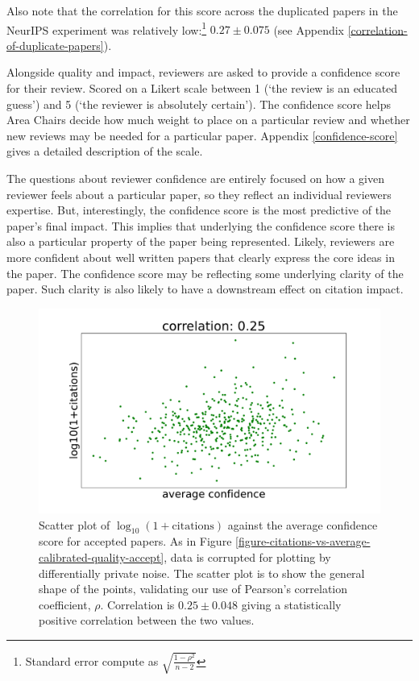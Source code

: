 \documentclass[twoside]{article}
\begin{document}
Also note that the correlation for this score across the duplicated papers in the NeurIPS experiment was relatively low:\footnote{Standard error compute as $\sqrt{\frac{1-\rho^2}{n-2}}$} $0.27 \pm 0.075$ (see Appendix \ref{correlation-of-duplicate-papers}).

Alongside quality and impact, reviewers are asked to provide a confidence score for their review. Scored on a Likert scale between 1 (`the review is an educated guess') and 5 (`the reviewer is absolutely certain'). The confidence score helps Area Chairs decide how much weight to place on a particular review and whether new reviews may be needed for a particular paper. Appendix \ref{confidence-score} gives a detailed description of the scale.  

The questions about reviewer confidence are entirely focused on how a given reviewer feels about a particular paper, so they reflect an individual reviewers expertise. But, interestingly, the confidence score is the most predictive of the paper's final impact. This implies that underlying the confidence score there is also a particular property of the paper being represented. Likely, reviewers are more confident about well written papers that clearly express the core ideas in the paper. The confidence score may be reflecting some underlying clarity of the paper. Such clarity is also likely to have a downstream effect on citation impact.

\begin{figure}[htb]
\includegraphics[width=0.9\columnwidth]{diagrams/neurips/citations-vs-average-confidence-accept.pdf}

\caption{Scatter plot of $\log_{10}(1+\text{citations})$ against the average confidence score for accepted papers. As in Figure \ref{figure-citations-vs-average-calibrated-quality-accept}, data is corrupted for plotting by differentially private noise. The scatter plot is to show the general shape of the points, validating our use of Pearson's correlation coefficient, $\rho$. Correlation is $0.25 \pm 0.048$ giving a statistically positive correlation between the two values.}
\label{figure-citations-vs-average-confidence-accept}
\end{figure}
\end{document}
